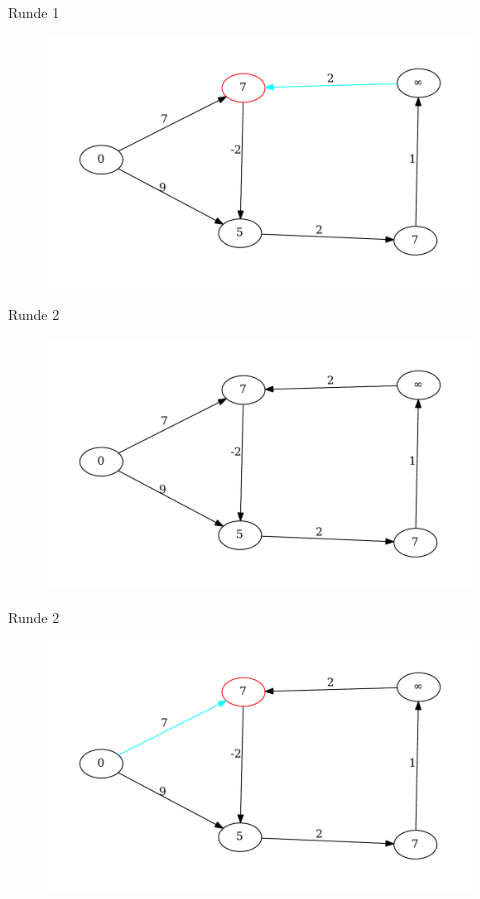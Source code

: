 \begin{frame}{Runde 1}
\begin{figure}[htbp]
\centering
\includegraphics[width=\linewidth]{bellman_ford_graphs/graph_06.pdf}
\end{figure}
\end{frame}

\begin{frame}{Runde 2}
\begin{figure}[htbp]
\centering
\includegraphics[width=\linewidth]{bellman_ford_graphs/graph_07.pdf}
\end{figure}
\end{frame}

\begin{frame}{Runde 2}
\begin{figure}[htbp]
\centering
\includegraphics[width=\linewidth]{bellman_ford_graphs/graph_08.pdf}
\end{figure}
\end{frame}

